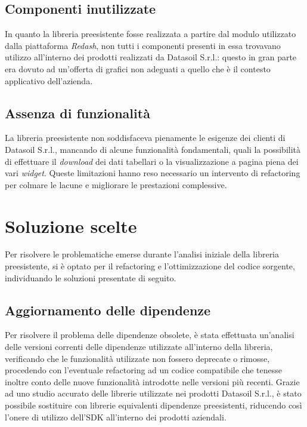\subsection{Componenti inutilizzate}
In quanto la libreria preesistente fosse realizzata a partire dal modulo utilizzato dalla piattaforma \textit{Redash}, non tutti i componenti presenti
in essa trovavano utilizzo all'interno dei prodotti realizzati da Datasoil S.r.l.: questo in gran parte era dovuto ad un'offerta di grafici non adeguati
a quello che è il contesto applicativo dell'azienda.

\subsection{Assenza di funzionalità}
La libreria preesistente non soddisfaceva pienamente le esigenze dei clienti di Datasoil S.r.l., mancando di alcune funzionalità fondamentali,
quali la possibilità di effettuare il \textit{download} dei dati tabellari o la visualizzazione a pagina piena dei vari \textit{widget}.
Queste limitazioni hanno reso necessario un intervento di refactoring per colmare le lacune e migliorare le prestazioni complessive.

\section{Soluzione scelte}
Per risolvere le problematiche emerse durante l'analisi iniziale della libreria preesistente, si è optato per il refactoring e l'ottimizzazione
del codice sorgente, individuando le soluzioni presentate di seguito.

\subsection{Aggiornamento delle dipendenze}
Per risolvere il problema delle dipendenze obsolete, è stata effettuata un'analisi delle versioni correnti delle dipendenze utilizzate all'interno della libreria,
verificando che le funzionalità utilizzate non fossero deprecate o rimosse, procedendo con l'eventuale refactoring ad un codice compatibile che tenesse inoltre conto
delle nuove funzionalità introdotte nelle versioni più recenti. \newline
Grazie ad uno studio accurato delle librerie utilizzate nei prodotti Datasoil S.r.l., è stato possibile sostituire con librerie equivalenti dipendenze preesistenti,
riducendo così l'onere di utilizzo dell'SDK all'interno dei prodotti aziendali.

